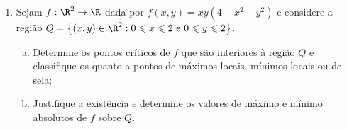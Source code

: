 \documentclass{book}
\begin{document}
\begin{enumerate}
\begin{sol}
Portanto, $(1,0,0)$ e $(-1,0,0)$.

\newpage 

\uline{outro modo}: Multiplicador de Lagrange

Minimizar $d^2 \left( {x,y,z} \right) = x^2  + y^2  + z^2$ sujeito a $x^2  - y^2  - z^2  = 1$. Seja $g\left( {x,y,z} \right) = x^2  - y^2  - z^2  - 1$

\[
\begin{gathered}
  \left\{ \begin{gathered}
  \nabla d^2  = \lambda \nabla g \hfill \\
  g\left( {x,y,z} \right) = 0 \hfill \\
\end{gathered}  \right. \hfill \\
  \nabla d^2  = \left( {2x,2y,2z} \right) \hfill \\
  \nabla g = \left( {2x, - 2y, - 2z} \right) \hfill \\
  \left\{ \begin{gathered}
  2x = \lambda 2x \hfill \\
  2y =  - \lambda 2y \hfill \\
  2z =  - \lambda 2z \hfill \\
  x^2  - y^2  - z^2  = 1 \hfill \\
\end{gathered}  \right. \hfill \\
   \Rightarrow y = 0 = z \hfill \\
   \Rightarrow x =  \pm 1 \hfill \\
\end{gathered}
\]

\end{sol}

  \item Sejam $f:\R^2 \to \R$ dada por $f\left( {x,y} \right) = xy\left( {4 - x^2  - y^2 } \right)$ e considere a regi\~ao $Q = \left\{ {\left( {x,y} \right) \in \R^2 :0 \leqslant x \leqslant 2{\text{ e }}0 \leqslant y \leqslant 2} \right\}$.

  \begin{enumerate}[(a)]
    \item Determine os pontos cr\'iticos de $f$ que s\~ao interiores \`a regi\~ao $Q$ e classifique-os quanto a pontos de m\'aximos locais, m\'inimos locais ou de sela;
    \item Justifique a exist\^encia e determine os valores de m\'aximo e m\'inimo absolutos de $f$ sobre $Q$.
  \end{enumerate}


\end{enumerate}
\end{document}
